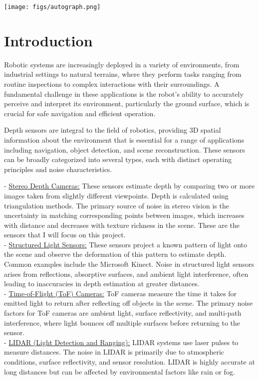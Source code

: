 \documentclass[12pt,a4paper,oneside,onecolumn]{book}
\begin{document}
\texttt{[image: figs/autograph.png]}



\tableofcontents
\listoffigures
\listoftables

\mainmatter




\chapter{Introduction}
Robotic systems are increasingly deployed in a variety of environments, from industrial settings to natural terrains, where they perform tasks ranging from routine inspections to complex interactions with their surroundings. A fundamental challenge in these applications is the robot's ability to accurately perceive and interpret its environment, particularly the ground surface, which is crucial for safe navigation and efficient operation\cite{example2024}. 

Depth sensors are integral to the field of robotics, providing 3D spatial information about the environment that is essential for a range of applications including navigation, object detection, and scene reconstruction. These sensors can be broadly categorized into several types, each with distinct operating principles and noise characteristics. 


- \underline{Stereo Depth Cameras:} These sensors estimate depth by comparing two or more images taken from slightly different viewpoints. Depth is calculated using triangulation methods. The primary source of noise in stereo vision is the uncertainty in matching corresponding points between images, which increases with distance and decreases with texture richness in the scene. These are the sensors that I will focus on this project. 
\\[1em]
- \underline{Structured Light Sensors:} These sensors project a known pattern of light onto the scene and observe the deformation of this pattern to estimate depth. Common examples include the Microsoft Kinect. Noise in structured light sensors arises from reflections, absorptive surfaces, and ambient light interference, often leading to inaccuracies in depth estimation at greater distances. 
\\[1em]
- \underline{Time-of-Flight (ToF) Cameras:} ToF cameras measure the time it takes for emitted light to return after reflecting off objects in the scene. The primary noise factors for ToF cameras are ambient light, surface reflectivity, and multi-path interference, where light bounces off multiple surfaces before returning to the sensor. 
\\[1em]
- \underline{LIDAR (Light Detection and Ranging):} LIDAR systems use laser pulses to measure distances. The noise in LIDAR is primarily due to atmospheric conditions, surface reflectivity, and sensor resolution. LIDAR is highly accurate at long distances but can be affected by environmental factors like rain or fog. 
\end{document}

